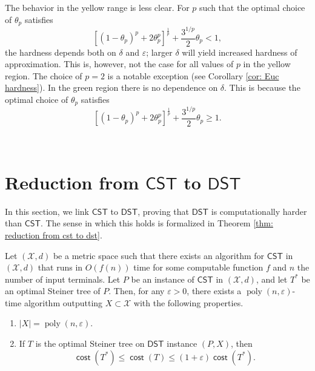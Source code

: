 \documentclass{theoretics}
\DeclareMathOperator{\cost}{\mathsf{cost}}
\DeclareMathOperator{\poly}{poly}
\newcommand{\1}{\textbf{1}}
\newcommand{\cst}{$\mathsf{CST}$\xspace}
\newcommand{\dst}{$\mathsf{DST}$\xspace}
\newcommand{\pcoord}{\theta_p}
\begin{document}
The behavior in the yellow range is less clear. For $p$ such that the optimal choice of $\theta_p$ satisfies
\[
[(1-\pcoord)^p + 2\pcoord^p]^{\frac{1}{p}} +\frac{3^{1/p}}{2}\pcoord < 1,
\]
the hardness depends both on $\delta$ and $\varepsilon$; larger $\delta$ will yield increased hardness of approximation. This is, however, not the case for all values of $p$ in the yellow region. The choice of $p=2$ is a notable exception (see Corollary \ref{cor: Euc hardness}). In the green region there is no dependence on $\delta$. This is because the optimal choice of $\theta_p$ satisfies
\[
[(1-\pcoord)^p + 2\pcoord^p]^{\frac{1}{p}} +\frac{3^{1/p}}{2}\pcoord \geq 1.
\]


~\section{Reduction from \texorpdfstring{\cst}{CST} to \texorpdfstring{\dst}{DST}} \label{sec: reduction from cst to dst}
In this section, we link \cst to \dst, proving that \dst is computationally harder than \cst. The sense in which this holds is formalized in Theorem \ref{thm: reduction from cst to dst}.
\begin{theorem} \label{thm: reduction from cst to dst}
Let $(\mathcal{X}, d)$ be a metric space such that there exists an algorithm for \cst in $(\mathcal{X}, d)$ that runs in $O(f(n))$ time for some computable function $f$ and $n$ the number of input terminals. Let $P$ be an instance of \cst in $(\mathcal{X}, d)$, and let $T^*$ be an optimal Steiner tree of $P$. Then, for any $\varepsilon > 0$, there exists a $\poly(n, \varepsilon)$-time algorithm outputting $X \subset \mathcal{X}$  with the following properties.
\begin{enumerate}
    \item $|X| = \poly(n, \varepsilon).$
    \item If $T$ is the optimal Steiner tree on \dst instance $(P, X)$, then 
    \[
    \cost(T^*) \leq \cost(T) \leq (1 + \varepsilon)\cost(T^*).
    \]
\end{enumerate}
\end{theorem}
\end{document}
